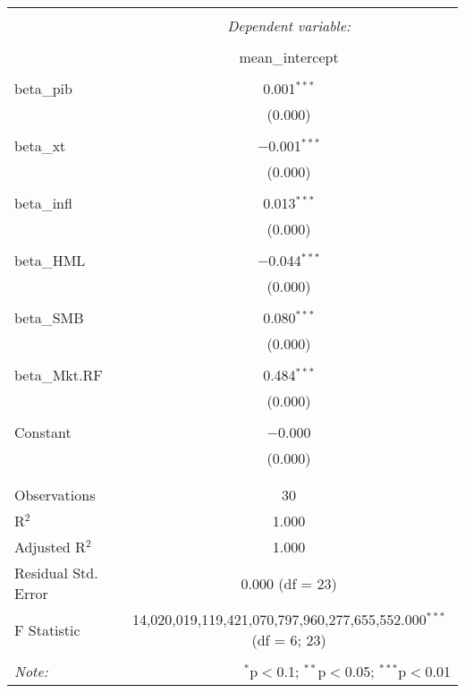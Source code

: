 
\begin{table}[!htbp] \centering 
  \caption{} 
  \label{} 
\begin{tabular}{@{\extracolsep{5pt}}lc} 
\\[-1.8ex]\hline 
\hline \\[-1.8ex] 
 & \multicolumn{1}{c}{\textit{Dependent variable:}} \\ 
\cline{2-2} 
\\[-1.8ex] & mean\_intercept \\ 
\hline \\[-1.8ex] 
 beta\_pib & 0.001$^{***}$ \\ 
  & (0.000) \\ 
  & \\ 
 beta\_xt & $-$0.001$^{***}$ \\ 
  & (0.000) \\ 
  & \\ 
 beta\_infl & 0.013$^{***}$ \\ 
  & (0.000) \\ 
  & \\ 
 beta\_HML & $-$0.044$^{***}$ \\ 
  & (0.000) \\ 
  & \\ 
 beta\_SMB & 0.080$^{***}$ \\ 
  & (0.000) \\ 
  & \\ 
 beta\_Mkt.RF & 0.484$^{***}$ \\ 
  & (0.000) \\ 
  & \\ 
 Constant & $-$0.000 \\ 
  & (0.000) \\ 
  & \\ 
\hline \\[-1.8ex] 
Observations & 30 \\ 
R$^{2}$ & 1.000 \\ 
Adjusted R$^{2}$ & 1.000 \\ 
Residual Std. Error & 0.000 (df = 23) \\ 
F Statistic & 14,020,019,119,421,070,797,960,277,655,552.000$^{***}$ (df = 6; 23) \\ 
\hline 
\hline \\[-1.8ex] 
\textit{Note:}  & \multicolumn{1}{r}{$^{*}$p$<$0.1; $^{**}$p$<$0.05; $^{***}$p$<$0.01} \\ 
\end{tabular} 
\end{table} 
